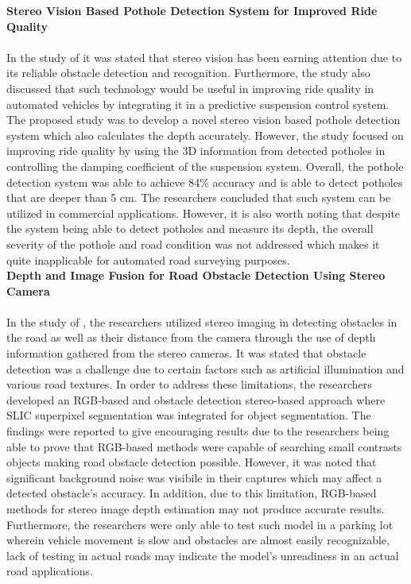 \noindent\textbf{\large Stereo Vision Based Pothole Detection System for Improved Ride Quality} \\\\
In the study of  it was stated that stereo vision has been earning attention due to its reliable obstacle detection and recognition. Furthermore, the study also discussed that such technology would be useful in improving ride quality in automated vehicles by integrating it in a predictive suspension control system. The proposed study was to develop a novel stereo vision based pothole detection system which also calculates the depth accurately. However, the study focused on improving ride quality by using the 3D information from detected potholes in controlling the damping coefficient of the suspension system. Overall, the pothole detection system was able to achieve 84\% accuracy and is able to detect potholes that are deeper than 5 cm. The researchers concluded that such system can be utilized in commercial applications. However, it is also worth noting that despite the system being able to detect potholes and measure its depth, the overall severity of the pothole and road condition was not addressed which makes it quite inapplicable for automated road surveying purposes. \\

\noindent\textbf{\large Depth and Image Fusion for Road Obstacle Detection Using Stereo Camera} \\\\
In the study of , the researchers utilized stereo imaging in detecting obstacles in the road as well as their distance from the camera through the use of depth information gathered from the stereo cameras. It was stated that obstacle detection was a challenge due to certain factors such as artificial illumination and various road textures. In order to address these limitations, the researchers developed an RGB-based and obstacle detection stereo-based approach where SLIC superpixel segmentation was integrated for object segmentation. The findings were reported to give encouraging results due to the researchers being able to prove that RGB-based methods were capable of searching small contrasts objects making road obstacle detection possible. However, it was noted that significant background noise was visibile in their captures which may affect a detected obstacle's accuracy. In addition, due to this limitation, RGB-based methods for stereo image depth estimation may not produce accurate results. Furthermore, the researchers were only able to test such model in a parking lot wherein vehicle movement is slow and obstacles are almost easily recognizable, lack of testing in actual roads may indicate the model's unreadiness in an actual road applications.

